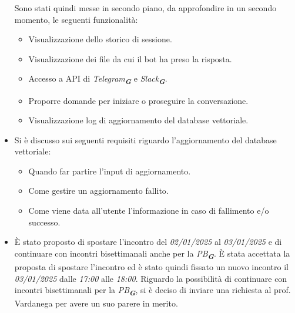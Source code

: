 \begin{itemize}
    Sono stati quindi messe in secondo piano, da approfondire in un secondo momento, le seguenti funzionalità:
    \begin{itemize}
        \item Visualizzazione dello storico di sessione.
        \item Visualizzazione dei file da cui il bot ha preso la risposta.
        \item Accesso a API di \emph{Telegram}\textsubscript{\textit{\textbf{G}}} e \emph{Slack}\textsubscript{\textit{\textbf{G}}}.
        \item Proporre domande per iniziare o proseguire la conversazione.
        \item Visualizzazione log di aggiornamento del database vettoriale.
    \end{itemize}
    \item Si è discusso sui seguenti requisiti riguardo l'aggiornamento del database vettoriale:
    \begin{itemize}
        \item Quando far partire l'input di aggiornamento.
        \item Come gestire un aggiornamento fallito.
        \item Come viene data all'utente l'informazione in caso di fallimento e/o successo.
    \end{itemize}
    \item È stato proposto di spostare l'incontro del \emph{02/01/2025} al \emph{03/01/2025} e di continuare con incontri bisettimanali anche per la \emph{PB}\textsubscript{\textbf{\textit{G}}}.
    È stata accettata la proposta di spostare l'incontro ed è stato quindi fissato un nuovo incontro il \emph{03/01/2025} dalle \emph{17:00} alle \emph{18:00}.
    Riguardo la possibilità di continuare con incontri bisettimanali per la \emph{PB}\textsubscript{\textbf{\textit{G}}}, si è deciso di inviare una richiesta al prof. Vardanega per avere un suo parere in merito.
\end{itemize}